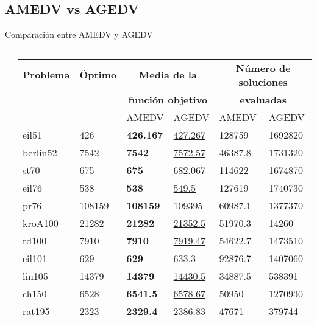 	\subsection*{AMEDV vs AGEDV}	

		\begin{frame}{Comparación entre AMEDV y AGEDV}
			\fontsize{6}{8}\selectfont					
			\kern -0.25cm
			\begin{columns}[c]
				\begin{table}[H]
			        \label{table:agedv}
		        	\centering
		        	\begin{tabular}{llll|ll}
		        		\toprule
		        		\textbf{Problema} & \textbf{Óptimo} & \multicolumn{2}{c}{\color{red}\textbf{Media de la}} &   \multicolumn{2}{c}{\color{red}\textbf{Número de soluciones}} \\
		        		&  & \multicolumn{2}{c}{\color{red}\textbf{función objetivo}} & \multicolumn{2}{c}{\color{red}\textbf{evaluadas}}\\
		        		\midrule
		        		& & AMEDV & AGEDV & AMEDV & AGEDV \\
		        		\cmidrule{3-4} \cmidrule{5-6}
		        		eil51    & 426    & \textbf{426.167} & \underline{427.267} & 128759  & 1692820 \\
		        		berlin52 & 7542   & \textbf{7542}    & \underline{7572.57} & 46387.8 & 1731320 \\
		        		st70     & 675    & \textbf{675}     & \underline{682.067} & 114622  & 1674870 \\
		        		eil76    & 538    & \textbf{538}     & \underline{549.5}   & 127619  & 1740730 \\
		        		pr76     & 108159 & \textbf{108159}  & \underline{109395}  & 60987.1 & 1377370 \\
		        		kroA100  & 21282  & \textbf{21282}   & \underline{21352.5} & 51970.3 & 14260   \\
		        		rd100    & 7910   & \textbf{7910}    & \underline{7919.47} & 54622.7 & 1473510 \\
		        		eil101   & 629    & \textbf{629}     & \underline{633.3}   & 92876.7 & 1407060 \\
		        		lin105   & 14379  & \textbf{14379}   & \underline{14430.5} & 34887.5 & 538391  \\
		        		ch150    & 6528   & \textbf{6541.5}  & \underline{6578.67} & 50950   & 1270930 \\
		        		rat195   & 2323   & \textbf{2329.4}  & \underline{2386.83} & 47671   & 379744  \\

\end{tabular}
\end{table}
\end{columns}
\end{frame}
